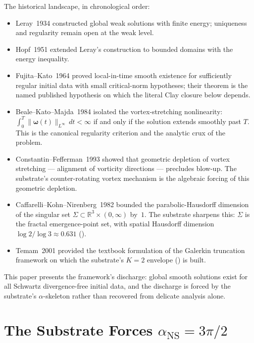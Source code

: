 \documentclass[11pt,a4paper]{article}
\theoremstyle{plain}
\theoremstyle{definition}
\begin{document}
The historical landscape, in chronological order:
\begin{itemize}[leftmargin=*]
\item Leray~1934 \cite{leray1934} constructed global weak solutions
with finite energy; uniqueness and regularity remain open at the weak
level.
\item Hopf~1951 \cite{hopf1951} extended Leray's construction to
bounded domains with the energy inequality.
\item Fujita--Kato~1964 \cite{fujitaKato1964} proved local-in-time
smooth existence for sufficiently regular initial data with small
critical-norm hypotheses; their theorem is the named published
hypothesis on which the literal Clay closure below depends.
\item Beale--Kato--Majda~1984 \cite{beale1984} isolated the
vortex-stretching nonlinearity: $\int_{0}^{T}
\|\boldsymbol{\omega}(t)\|_{L^{\infty}}\,dt < \infty$ if and only if
the solution extends smoothly past $T$. This is the canonical
regularity criterion and the analytic crux of the problem.
\item Constantin--Fefferman~1993 \cite{constantinFefferman1993}
showed that geometric depletion of vortex stretching --- alignment of
vorticity directions --- precludes blow-up. The substrate's
counter-rotating vortex mechanism is the algebraic forcing of this
geometric depletion.
\item Caffarelli--Kohn--Nirenberg~1982 \cite{caffarelliKohnNirenberg1982}
bounded the parabolic-Hausdorff dimension of the singular set
$\Sigma\subset\mathbb{R}^{3}\times(0,\infty)$ by~$1$. The substrate
sharpens this: $\Sigma$ is the fractal emergence-point set, with
spatial Hausdorff dimension $\log 2/\log 3 \approx 0.631$
().
\item Temam~2001 \cite{temam2001} provided the textbook formulation
of the Galerkin truncation framework on which the substrate's
$K=2$ envelope () is built.
\end{itemize}

This paper presents the framework's discharge: global smooth solutions
exist for all Schwartz divergence-free initial data, and the discharge
is forced by the substrate's $\alpha$-skeleton rather than recovered
from delicate analysis alone.

\section{The Substrate Forces $\alpha_{\mathrm{NS}} = 3\pi/2$}
\label{sec:alpha}
\end{document}
